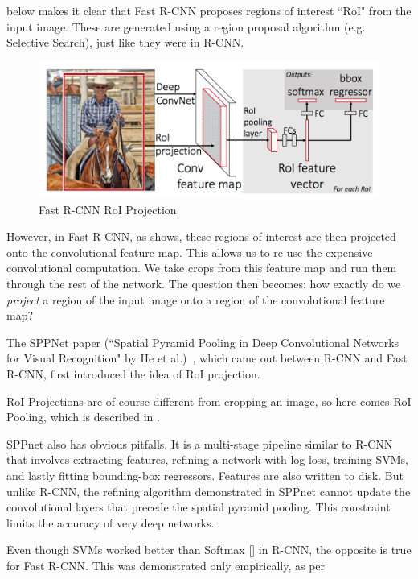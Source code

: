  below makes it clear that Fast R-CNN proposes regions of interest ``RoI" from the input image. These are generated using a region proposal algorithm (e.g. Selective Search), just like they were in R-CNN.

\begin{figure}[H]
	\centering
	\includegraphics[scale=0.55]{images/fast-rcnn-arch.png}
	\caption{Fast R-CNN RoI Projection}
	\label{f:fast-rcnn-arch}
\end{figure}

However, in Fast R-CNN, as  shows, these regions of interest are then projected onto the convolutional feature map. This allows us to re-use the expensive convolutional computation. We take crops from this feature map and run them through the rest of the network. The question then becomes: how exactly do we \textit{project} a region of the input image onto a region of the convolutional feature map?

The SPPNet paper (``Spatial Pyramid Pooling in Deep Convolutional
Networks for Visual Recognition" by He et al.)~\cite{he2015spatial}, which came out between R-CNN and Fast R-CNN, first introduced the idea of RoI projection.

RoI Projections are of course different from cropping an image, so here comes RoI Pooling, which is described in .

SPPnet also has obvious pitfalls. It is a multi-stage pipeline similar to R-CNN that involves extracting features, refining a network with log loss, training SVMs, and lastly fitting bounding-box regressors. Features are also written to disk. But unlike R-CNN, the refining algorithm demonstrated in SPPnet cannot update the convolutional layers that precede the spatial pyramid pooling. This constraint limits the accuracy of very deep networks.

Even though SVMs worked better than Softmax [] in R-CNN, the opposite is true for Fast R-CNN. This was demonstrated only empirically, as per 

